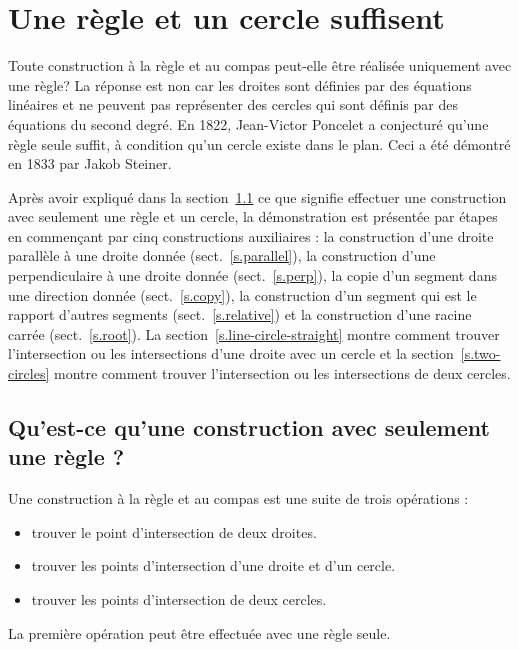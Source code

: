 \chapter{Une règle et un cercle suffisent}\label{c.straightedge}



Toute construction à la règle et au  compas peut-elle être réalisée uniquement avec une règle? La réponse est non car les droites sont définies par des équations linéaires et ne peuvent pas représenter des cercles qui sont définis par des équations du second degré. En 1822, Jean-Victor Poncelet a conjecturé qu'une règle seule suffit, à condition qu'un cercle existe dans le plan. Ceci a été démontré en 1833 par Jakob Steiner.

Après avoir expliqué dans la section~\ref{s.se-what} ce que signifie effectuer une construction avec seulement une règle et un cercle, la démonstration est présentée par étapes en commençant par cinq constructions auxiliaires : la construction d'une droite parallèle à une droite donnée (sect.~\ref{s.parallel}), la construction d'une perpendiculaire à une droite donnée (sect.~\ref{s.perp}), la copie d'un segment  dans une direction donnée (sect.~\ref{s.copy}), la construction d'un segment  qui est le rapport d'autres segments (sect.~\ref{s.relative}) et la construction d'une racine carrée (sect.~\ref{s.root}). La section~\ref{s.line-circle-straight} montre comment trouver l'intersection ou les intersections d'une droite avec un cercle et la section~\ref{s.two-circles} montre comment trouver l'intersection ou les intersections de deux cercles.

\section{Qu'est-ce qu'une construction avec seulement une règle ?}\label{s.se-what}
Une construction à la règle et au  compas est une suite de trois opérations :
\begin{itemize}
\item trouver le point d'intersection de deux droites.
\item trouver  les points d'intersection d'une droite et d'un cercle.
\item trouver  les points d'intersection de deux cercles.
\end{itemize}
La première opération peut être effectuée avec une règle seule.

